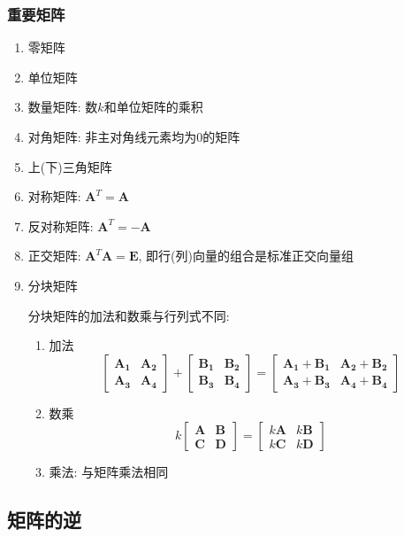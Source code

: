 \subsubsection{重要矩阵}
\begin{enumerate}
\item 零矩阵
\item 单位矩阵
\item 数量矩阵: 数$ k $和单位矩阵的乘积
\item 对角矩阵: 非主对角线元素均为$ 0 $的矩阵
\item 上(下)三角矩阵
\item 对称矩阵: $ \bm{A}^{T}=\bm{A} $
\item 反对称矩阵: $ \bm{A}^{T}=-\bm{A} $
\item 正交矩阵: $ \bm{A}^{T}\bm{A}=\bm{E} $, 即行(列)向量的组合是标准正交向量组
\item 分块矩阵\par
分块矩阵的加法和数乘与行列式不同:
\begin{enumerate}
\item 加法
\begin{equation*}
\begin{bmatrix}
\bm{A_{1}} & \bm{A_{2}} \\ \bm{A_{3}} & \bm{A_{4}}
\end{bmatrix} + 
\begin{bmatrix}
\bm{B_{1}} & \bm{B_{2}} \\ \bm{B_{3}} & \bm{B_{4}}
\end{bmatrix} = 
\begin{bmatrix}
\bm{A_{1}}+\bm{B_{1}} & \bm{A_{2}}+\bm{B_{2}} \\ \bm{A_{3}}+\bm{B_{3}} & \bm{A_{4}}+\bm{B_{4}}
\end{bmatrix}
\end{equation*}
\item 数乘
\begin{equation*}
k\begin{bmatrix}
\bm{A} & \bm{B} \\ \bm{C} & \bm{D}
\end{bmatrix} = 
\begin{bmatrix}
k\bm{A} & k\bm{B} \\ k\bm{C} & k\bm{D}
\end{bmatrix}
\end{equation*}
\item 乘法: 与矩阵乘法相同
\end{enumerate}
\end{enumerate}
\subsection{矩阵的逆}
